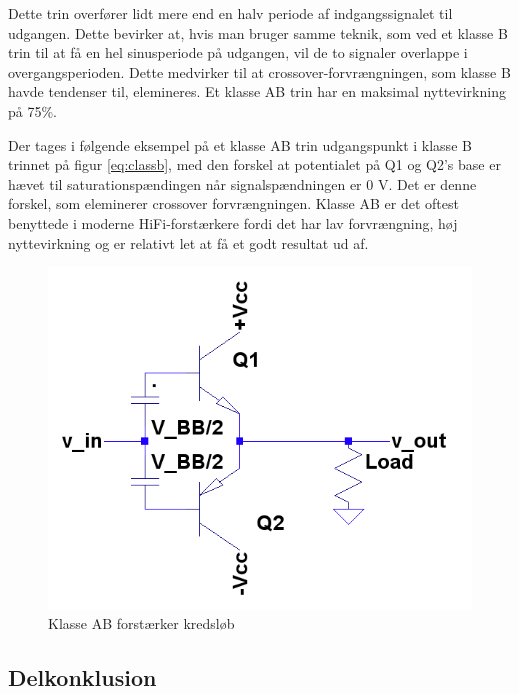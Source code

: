 Dette trin overfører lidt mere end en halv periode af indgangssignalet til udgangen. Dette bevirker at, hvis man bruger samme teknik, som ved et klasse B trin til at få en hel sinusperiode på udgangen, vil de to signaler overlappe i overgangsperioden. Dette medvirker til at crossover-forvrængningen, som klasse B havde tendenser til, elemineres. 
Et klasse AB trin har en maksimal nyttevirkning på 75\%.

Der tages i følgende eksempel på et klasse AB trin udgangspunkt i klasse B trinnet på figur \ref{eq:classb}, med den forskel at potentialet på Q1 og Q2's base er hævet til saturationspændingen når signalspændningen er 0 V. Det er denne forskel, som eleminerer crossover forvrængningen.
Klasse AB er det oftest benyttede i moderne HiFi-forstærkere fordi det har lav forvrængning, høj nyttevirkning og er relativt let at få et godt resultat ud af. 

\begin{figure}[h]
\centering
\includegraphics[scale=.35]{indledende_analyse/klasser/classab.png}
\caption{Klasse AB forstærker kredsløb}
\label{fig:classab}
\end{figure}


\subsection{Delkonklusion}


